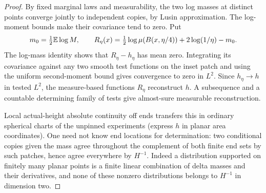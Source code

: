\begin{proof}
By fixed marginal laws and measurability, the two log masses at distinct
points converge jointly to independent copies, by Lusin approximation.
The log-moment bounds make their covariance tend to zero. Put
\[
 m_0=\tfrac12\mathbb E\log M,\qquad
 R_\eta(x)=\tfrac12\log\mu(B(x,\eta/4))
                         +2\log(1/\eta)-m_0.
\]
The log-mass identity shows that \(R_\eta-h_\eta\) has mean zero.
Integrating its covariance against any two smooth test functions on the
inset patch and using the uniform second-moment bound gives convergence
to zero in \(L^2\). Since \(h_\eta\to h\) in tested \(L^2\), the
measure-based functions \(R_\eta\) reconstruct \(h\). A subsequence
and a countable determining family of tests give almost-sure measurable
reconstruction.

Local actual-height absolute continuity off ends transfers this in ordinary spherical charts of the
unpinned experiments (express \(h\) in planar area coordinates). One need not know end locations for
determination: two conditional copies given the mass agree throughout the complement of both finite
end sets by such patches, hence agree everywhere by \(H^{-1}\). Indeed a distribution supported on finitely many
planar points is a finite linear combination of delta masses and their derivatives, and none of these
nonzero distributions belongs to \(H^{-1}\) in dimension two.

\end{proof}

